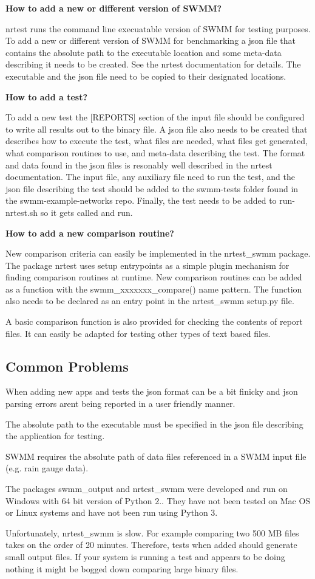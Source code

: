 {\bfseries How to add a new or different version of S\+W\+MM?}

nrtest runs the command line execuatable version of S\+W\+MM for testing purposes. To add a new or different version of S\+W\+MM for benchmarking a json file that contains the absolute path to the executable location and some meta-\/data describing it needs to be created. See the nrtest documentation for details. The executable and the json file need to be copied to their designated locations.

{\bfseries How to add a test?}

To add a new test the \mbox{[}R\+E\+P\+O\+R\+TS\mbox{]} section of the input file should be configured to write all results out to the binary file. A json file also needs to be created that describes how to execute the test, what files are needed, what files get generated, what comparison routines to use, and meta-\/data describing the test. The format and data found in the json files is resonably well described in the nrtest documentation. The input file, any auxiliary file need to run the test, and the json file describing the test should be added to the swmm-\/tests folder found in the swmm-\/example-\/networks repo. Finally, the test needs to be added to run-\/nrtest.\+sh so it gets called and run.

{\bfseries How to add a new comparison routine?}

New comparison criteria can easily be implemented in the nrtest\+\_\+swmm package. The package nrtest uses setup entrypoints as a simple plugin mechanism for finding comparison routines at runtime. New comparison routines can be added as a function with the swmm\+\_\+xxxxxxx\+\_\+compare() name pattern. The function also needs to be declared as an entry point in the nrtest\+\_\+swmm setup.\+py file.

A basic comparison function is also provided for checking the contents of report files. It can easily be adapted for testing other types of text based files.

\subsection*{Common Problems}

When adding new apps and tests the json format can be a bit finicky and json parsing errors aren\textquotesingle{}t being reported in a user friendly manner.

The absolute path to the executable must be specified in the json file describing the application for testing.

S\+W\+MM requires the absolute path of data files referenced in a S\+W\+MM input file (e.\+g. rain gauge data).

The packages swmm\+\_\+output and nrtest\+\_\+swmm were developed and run on Windows with 64 bit version of Python 2.. They have not been tested on Mac OS or Linux systems and have not been run using Python 3.

Unfortunately, nrtest\+\_\+swmm is slow. For example comparing two 500 MB files takes on the order of 20 minutes. Therefore, tests when added should generate small output files. If your system is running a test and appears to be doing nothing it might be bogged down comparing large binary files. 